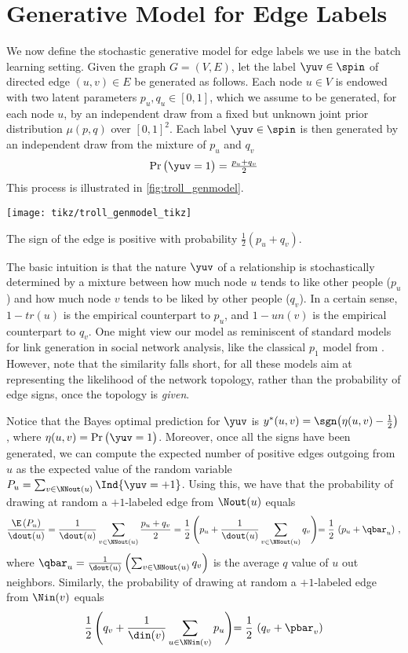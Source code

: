 \section{Generative Model for Edge Labels}\label{s:gen}

We now define the stochastic generative model for edge labels we use in the batch learning setting.
Given the graph $G = (V,E)$, let the label $\yuv \in \spin$ of directed edge $(u,v) \in E$ be
generated as follows. Each node $u \in V$ is endowed with two latent parameters $p_u, q_u \in
[0,1]$, which we assume to be generated, for each node $u$, by an independent draw from a fixed but
unknown joint prior distribution $\mu(p,q)$ over $[0,1]^2$. Each label $\yuv \in \spin$ is then
generated by an independent draw from the mixture of $p_u$ and $q_v$
$$\Pr\big( \yuv = 1 \big) = \tfrac{p_u + q_v}{2}$$
This process is illustrated in \autoref{fig:troll_genmodel}.
\begin{marginfigure}
	\centering
	\texttt{[image: tikz/troll\_genmodel\_tikz]}
	\caption{The sign \yuv{} of the edge \euv{} is positive with probability $\frac{1}{2}(p_u+q_v)$.
	\label{fig:troll_genmodel}}
\end{marginfigure}

The basic intuition is that the nature $\yuv$ of a relationship \euv{} is stochastically
determined by a mixture between how much node $u$ tends to like other people ($p_u$) and how much
node $v$ tends to be liked by other people ($q_v$). In a certain sense, $1-tr(u)$ is the empirical
counterpart to $p_u$, and $1-un(v)$ is the empirical counterpart to $q_v$. One might view
our model as reminiscent of standard models for link generation in social network analysis, like the
classical $p_1$ model from \cite{hl81}. However, note that the similarity falls short, for all these
models aim at
representing the likelihood of the network topology, rather than the probability of edge signs, once
the topology is \emph{given}.

Notice that the Bayes optimal prediction for $\yuv$ is $y^*(u,v) = \sgn\big(\eta(u,v) -
\tfrac{1}{2}\big)$, where $\eta(u,v) = \Pr\big( \yuv = 1 \big)$. Moreover, once all the signs have
been generated, we can compute the expected number of positive edges outgoing from $u$ as the
expected value of the random variable $P_u = \sum_{v\in \NNout(u)} \Ind{\yuv = +1}$. Using this, we
have that the probability of
drawing at random a $+1$-labeled edge from $\Nout(u)$ equals
\begin{equation}\label{e:pout}
	\frac{\E\left(P_u\right)}{\dout(u)} =
	\frac{1}{\dout(u)} \sum_{v\in \NNout(u)} \frac{p_u + q_v}{2} =
	\frac{1}{2}\,\Biggl(p_u + \frac{1}{\dout(u)} \sum_{v\in \NNout(u)} q_v \Biggl) =
		\frac{1}{2}\,\left(p_u + \qbar_u\right)\,,
\end{equation}
where $\qbar_u = \frac{1}{\dout(u)} \left( \sum_{v\in \NNout(u)} q_v \right)$ is the average $q$
value of $u$ out neighbors.
Similarly, the probability of drawing at random a $+1$-labeled edge from $\Nin(v)$ equals
\begin{equation}\label{e:pin}
	\frac{1}{2}\,\Biggl(q_v + \frac{1}{\din(v)} \sum_{u\in \NNin(v)} p_u \Biggl)=
		\frac{1}{2}\,\left(q_v + \pbar_v\right)
\end{equation}
